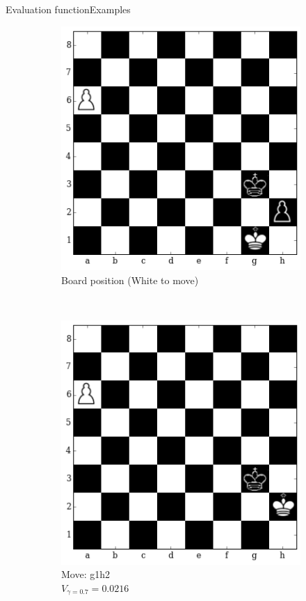 \documentclass[9pt, unknownkeysallowed]{beamer}
\begin{document}
\begin{frame}{Evaluation function}{Examples}
{\begin{figure}[H]
\begin{subfigure}[t]{0.3\textwidth}
\includegraphics[width=\textwidth]{../img/table_evaluations/output_15_0.png}
        \caption{Board position (White to move)}
    \end{subfigure}
    ~
    \begin{subfigure}[t]{0.3\textwidth}
        \centering
        
    \includegraphics[width=\textwidth]{../img/table_evaluations/output_15_2.png}
        \caption{Move: g1h2 \\
        $V_{\gamma=0.7}=0.0216$}
    \end{subfigure}
    ~
    \begin{subfigure}[t]{0.3\textwidth}
        \centering
        

\end{subfigure}
\end{figure}}
\end{frame}
\end{document}
